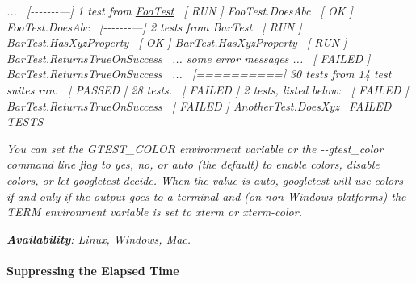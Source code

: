 {\itshape ...~\newline
 \mbox{[}-\/-\/-\/-\/-\/-\/-\/---\mbox{]} 1 test from \mbox{\hyperlink{class_foo_test}{Foo\+Test}}~\newline
 \mbox{[} R\+UN \mbox{]} Foo\+Test.\+Does\+Abc~\newline
 \mbox{[} OK \mbox{]} Foo\+Test.\+Does\+Abc~\newline
 \mbox{[}-\/-\/-\/-\/-\/-\/-\/---\mbox{]} 2 tests from Bar\+Test~\newline
 \mbox{[} R\+UN \mbox{]} Bar\+Test.\+Has\+Xyz\+Property~\newline
 \mbox{[} OK \mbox{]} Bar\+Test.\+Has\+Xyz\+Property~\newline
 \mbox{[} R\+UN \mbox{]} Bar\+Test.\+Returns\+True\+On\+Success~\newline
 ... some error messages ...~\newline
 \mbox{[} F\+A\+I\+L\+ED \mbox{]} Bar\+Test.\+Returns\+True\+On\+Success~\newline
 ...~\newline
 \mbox{[}==========\mbox{]} 30 tests from 14 test suites ran.~\newline
 \mbox{[} P\+A\+S\+S\+ED \mbox{]} 28 tests.~\newline
 \mbox{[} F\+A\+I\+L\+ED \mbox{]} 2 tests, listed below\+:~\newline
 \mbox{[} F\+A\+I\+L\+ED \mbox{]} Bar\+Test.\+Returns\+True\+On\+Success~\newline
 \mbox{[} F\+A\+I\+L\+ED \mbox{]} Another\+Test.\+Does\+Xyz~ F\+A\+I\+L\+ED T\+E\+S\+TS}

{\itshape You can set the {\ttfamily G\+T\+E\+S\+T\+\_\+\+C\+O\+L\+OR} environment variable or the {\ttfamily -\/-\/gtest\+\_\+color} command line flag to {\ttfamily yes}, {\ttfamily no}, or {\ttfamily auto} (the default) to enable colors, disable colors, or let googletest decide. When the value is {\ttfamily auto}, googletest will use colors if and only if the output goes to a terminal and (on non-\/\+Windows platforms) the {\ttfamily T\+E\+RM} environment variable is set to {\ttfamily xterm} or {\ttfamily xterm-\/color}.}

{\itshape  {\bfseries{Availability}}\+: Linux, Windows, Mac.}

{\itshape \paragraph*{Suppressing the Elapsed Time}}

